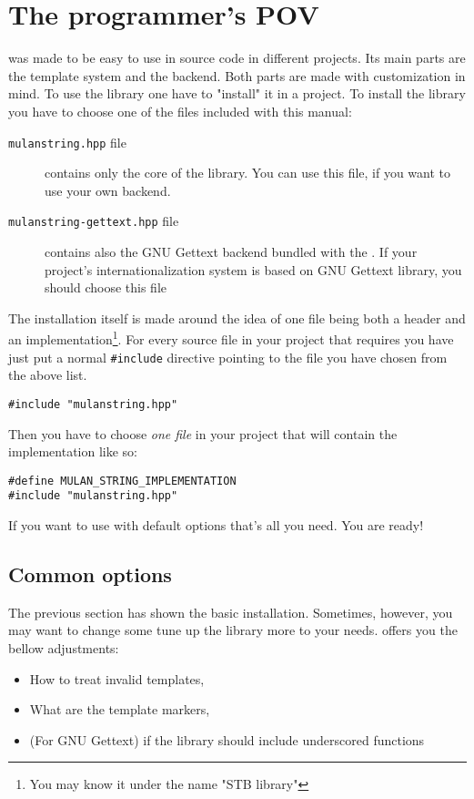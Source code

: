 \section{The programmer's POV}

\mulan{} was made to be easy to use in source code in different projects. Its main parts are the template system and the backend. 
Both parts are made with customization in mind. To use the library one have to "install" it in a project. 
To install the library you have to choose one of the files included with this manual:
\begin{description}
  \item[\texttt{mulanstring.hpp} file] contains only the core of the \mulan{} library. You can use this file, if you want to use your own backend.
  \item[\texttt{mulanstring-gettext.hpp} file] contains also the GNU Gettext backend bundled with the \mulan{}. If your project's internationalization system 
  is based on GNU Gettext library, you should choose this file
\end{description}

The installation itself is made around the idea of one file being both a header and an implementation\footnote{You may know it under the name "STB library"}.
For every source file in your project that requires \mulan{} you have just put a normal \verb+#include+ directive pointing to the file you have chosen from the above list.
\begin{verbatim}
#include "mulanstring.hpp"
\end{verbatim}
Then you have to choose \emph{one file} in your project that will contain the implementation like so:
\begin{verbatim}
#define MULAN_STRING_IMPLEMENTATION
#include "mulanstring.hpp"
\end{verbatim}
If you want to use \mulan{} with default options that's all you need. You are ready!

\subsection{Common options}
The previous section has shown the basic installation. Sometimes, however, you may want to change some tune up the library more to your needs.
\mulan{} offers you the bellow adjustments:
\begin{itemize}
  \item How to treat invalid templates,
  \item What are the template markers,
  \item (For GNU Gettext) if the library should include underscored functions
\end{itemize}

